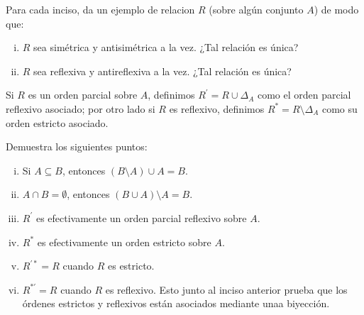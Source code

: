 \begin{exercise}[parzfc=2]
  Para cada inciso, da un ejemplo de relacion $R$ (sobre algún conjunto $A$) de modo que:
  \begin{enumerate}[i)]
    \item $R$ sea simétrica y antisimétrica a la vez. ¿Tal relación es única?
    \item $R$ sea reflexiva y antireflexiva a la vez. ¿Tal relación es única?
  \end{enumerate}
\end{exercise}

\begin{exercise}[parzfc=2]
  Si $R$ es un orden parcial sobre $A$, definimos $R^\prime=R\cup \Delta_A$ como el orden parcial reflexivo asociado; por otro lado si $R$ es reflexivo, definimos $R^*=R\setminus \Delta_A$ como su orden estricto asociado.

  Demuestra los siguientes puntos:
  \begin{enumerate}[i)]
      \item Si $A\subseteq B$, entonces $(B\setminus A)\cup A=B$.
      \item $A\cap B=\emptyset$, entonces $(B\cup A)\setminus A=B$.
      \item $R^\prime$ es efectivamente un orden parcial reflexivo sobre $A$.
      \item $R^*$ es efectivamente un orden estricto sobre $A$.
      \item $R^{\prime*}=R$ cuando $R$ es estricto.
      \item $R^{*\prime}=R$ cuando $R$ es reflexivo. Esto junto al inciso anterior prueba que los órdenes estrictos y reflexivos están asociados mediante unaa biyección.
  \end{enumerate}
\end{exercise}


